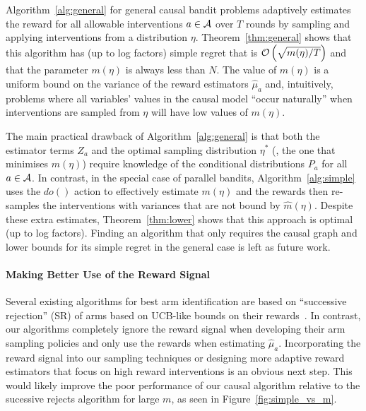 Algorithm~\ref{alg:general} for general causal bandit problems adaptively estimates the reward for all allowable interventions $a \in \mathcal A$ over $T$ rounds by sampling and applying interventions from a distribution $\eta$.
Theorem~\ref{thm:general} shows that this algorithm has (up to log factors) simple regret that is $\mathcal{O}\left( \sqrt{m(\eta)/T} \right)$ and that the parameter $m(\eta)$ is always less than $N$.
The value of $m(\eta)$ is a uniform bound on the variance of the reward estimators $\hat{\mu}_a$ and, intuitively, problems where all variables' values in the causal model ``occur naturally'' when interventions are sampled from $\eta$ will have low values of $m(\eta)$.

The main practical drawback of Algorithm~\ref{alg:general} is that both the estimator terms $Z_a$ and the optimal sampling distribution $\eta^*$ (\ie, the one that minimises $m(\eta)$) require knowledge of the conditional distributions $P_a$ for all $a \in \mathcal A$.
In contrast, in the special case of parallel bandits, Algorithm~\ref{alg:simple} uses the $do()$ action to effectively estimate $m(\eta)$ and the rewards then re-samples the interventions with variances that are not bound by $\hat{m}(\eta)$.
Despite these extra estimates, Theorem~\ref{thm:lower} shows that this approach is optimal (up to log factors).
Finding an algorithm that only requires the causal graph and lower bounds for its simple regret in the general case is left as future work.

\paragraph{Making Better Use of the Reward Signal}
Several existing algorithms for best arm identification are based on ``successive rejection'' (SR) of arms based on UCB-like bounds on their rewards~\citep{Even-Dar2002}.
In contrast, our algorithms completely ignore the reward signal when developing their arm sampling policies and only use the rewards when estimating $\hat{\mu}_a$.
Incorporating the reward signal into our sampling techniques or designing more adaptive reward estimators that focus on high reward interventions is an obvious next step.
This would likely improve the poor performance of our causal algorithm relative to the sucessive rejects algorithm for large $m$, as seen in Figure~\ref{fig:simple_vs_m}.

